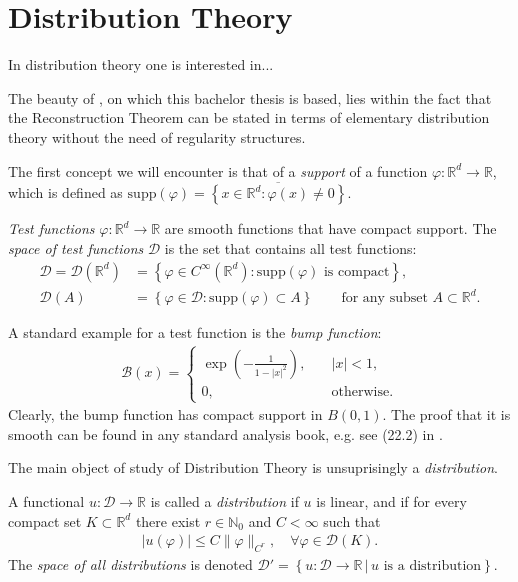 

\chapter{Distribution Theory}

In distribution theory one is interested in... 

The beauty of \cite{caravenna2021hairer}, on which this bachelor thesis is based, lies within the fact that the Reconstruction Theorem can be stated in terms of elementary distribution theory without the need of regularity structures. 

The first concept we will encounter is that of a \emph{support} of a function $\varphi: \mathbb{R}^d \to \mathbb{R}$, which is defined as $\mathrm{supp}(\varphi) = \overline{\left\{ x \in \mathbb{R}^d : \varphi(x) \neq 0 \right\}}$. 

\begin{definition}
    \emph{Test functions} $\varphi: \mathbb{R}^d \to \mathbb{R}$ are smooth functions that have compact support. The \emph{space of test functions} $\mathcal{D}$ is the set that contains all test functions:
    \begin{align*}
        \mathcal{D} = \mathcal{D}(\mathbb{R}^d) &= \left\{ \varphi \in C^\infty(\mathbb{R}^d) : \text{$\mathrm{supp}(\varphi)$ is compact} \right\}, \\
        \mathcal{D}(A) &= \left\{ \varphi \in \mathcal{D} : \mathrm{supp}(\varphi) \subset A \right\} \qquad \text{for any subset $A \subset \mathbb{R}^d$.}
    \end{align*}
\end{definition}

A standard example for a test function is the \emph{bump function}:
\begin{align*}
    \mathcal{B}(x) = \begin{cases}
        \exp{\left( -\frac{1}{1 - |x|^2} \right)}, \quad & |x| < 1, \\
        0, & \text{otherwise}.
    \end{cases}
\end{align*}
Clearly, the bump function has compact support in $B(0,1)$. The proof that it is smooth can be found in any standard analysis book, e.g. see (22.2) in \cite{Forster_2016}.

The main object of study of Distribution Theory is unsuprisingly a \emph{distribution}.
\begin{definition}[Distribution]
A functional $u: \mathcal{D} \to \mathbb{R}$ is called a \emph{distribution} if $u$ is linear, and if for every compact set $K \subset \mathbb{R}^d$ there exist $r \in \mathbb{N}_0$ and $C < \infty$ such that 
\begin{align*}
    |u(\varphi)| \leq C \lVert\varphi\rVert_{C^r}, \quad \forall \varphi \in \mathcal{D}(K).
\end{align*}
The \emph{space of all distributions} is denoted $\mathcal{D}' = \left\{ u: \mathcal{D} \to \mathbb{R} \, | \, \text{$u$ is a distribution} \right\}$.
\end{definition}

